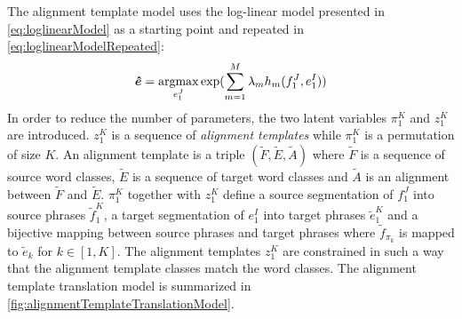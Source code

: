 The alignment template model uses the log-linear model presented
in \autoref{eq:loglinearModel} as a starting point and repeated in
\autoref{eq:loglinearModelRepeated}:
%
\begin{equation}
  \bm{\hat{e}} = \operatorname*{argmax}_{e_1^J} \exp(\sum_{m = 1}^M \lambda_m h_m(f_1^J, e_1^I))
  \label{eq:loglinearModelRepeated}
\end{equation}
%
In order to reduce the number of parameters, the two latent variables $\pi_1^K$
and $z_1^K$ are introduced. $z_1^K$ is a sequence of \emph{alignment templates}
while $\pi_1^K$ is a permutation of size $K$. An alignment template
is a triple $(\tilde{F}, \tilde{E}, \tilde{A})$ where $\tilde{F}$ is a
sequence of source word classes, $\tilde{E}$ is a sequence of target
word classes and $\tilde{A}$ is an alignment between $\tilde{F}$
and $\tilde{E}$. $\pi_1^K$ together with $z_1^K$ define
a source segmentation of $f_1^J$ into source phrases $\tilde{f}_1^K$,
a target segmentation of $e_1^I$ into target phrases $\tilde{e}_1^K$ and
a bijective mapping between source phrases and target phrases where
$\tilde{f}_{\pi_k}$ is mapped to $\tilde{e}_{k}$ for $k \in [1,K]$.
The alignment templates $z_1^K$ are constrained in such a way that
the alignment template classes match the word classes.
The alignment template translation model is summarized
in \autoref{fig:alignmentTemplateTranslationModel}.
%
